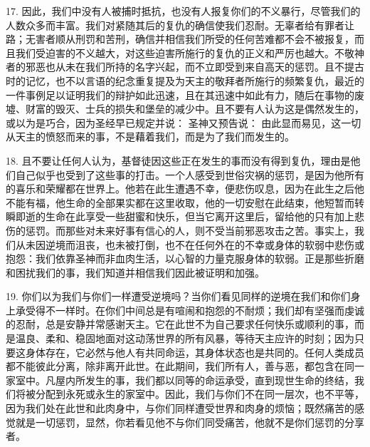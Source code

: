 17. 因此，我们中没有人被捕时抵抗，也没有人报复你们的不义暴行，尽管我们的人数众多而丰富。我们对紧随其后的复仇的确信使我们忍耐。无辜者给有罪者让路；无害者顺从刑罚和苦刑，确信并相信我们所受的任何苦难都不会不被报复，而且我们受迫害的不义越大，对这些迫害所施行的复仇的正义和严厉也越大。不敬神者的邪恶也从未在我们所持的名字兴起，而不立即受到来自高天的惩罚。且不提古时的记忆，也不以言语的纪念重复提及为天主的敬拜者所施行的频繁复仇，最近的一件事例足以证明我们的辩护如此迅速，且在其迅速中如此有力，随后在事物的废墟、财富的毁灭、士兵的损失和堡垒的减少中。且不要有人认为这是偶然发生的，或以为是巧合，因为圣经早已规定并说：  圣神又预告说：  由此显而易见，这一切从天主的愤怒而来的事，不是藉着我们，而是为了我们而发生的。\par

18. 且不要让任何人认为，基督徒因这些正在发生的事而没有得到复仇，理由是他们自己似乎也受到了这些事的打击。一个人感受到世俗灾祸的惩罚，是因为他所有的喜乐和荣耀都在世界上。他若在此生遭遇不幸，便悲伤叹息，因为在此生之后他不能有福，他生命的全部果实都在这里收取，他的一切安慰在此结束，他短暂而转瞬即逝的生命在此享受一些甜蜜和快乐，但当它离开这里后，留给他的只有加上悲伤的惩罚。而那些对未来好事有信心的人，则不受当前邪恶攻击之苦。事实上，我们从未因逆境而沮丧，也未被打倒，也不在任何外在的不幸或身体的软弱中悲伤或抱怨：我们依靠圣神而非血肉生活，以心智的力量克服身体的软弱。正是那些折磨和困扰我们的事，我们知道并相信我们因此被证明和加强。\par

19. 你们以为我们与你们一样遭受逆境吗？当你们看见同样的逆境在我们和你们身上承受得不一样时。在你们中间总是有喧闹和抱怨的不耐烦；我们却有坚强而虔诚的忍耐，总是安静并常感谢天主。它在此世不为自己要求任何快乐或顺利的事，而是温良、柔和、稳固地面对这动荡世界的所有风暴，等待天主应许的时刻；因为只要这身体存在，它必然与他人有共同命运，其身体状态也是共同的。任何人类成员都不能彼此分离，除非离开此世。在此期间，我们所有人，善与恶，都包含在同一家室中。凡屋内所发生的事，我们都以同等的命运承受，直到现世生命的终结，我们将被分配到永死或永生的家室中。因此，我们与你们不在同一层次，也不平等，因为我们处在此世和此肉身中，与你们同样遭受世界和肉身的烦恼；既然痛苦的感觉就是一切惩罚，显然，你若看见他不与你们同受痛苦，他就不是你们惩罚的分享者。\par

